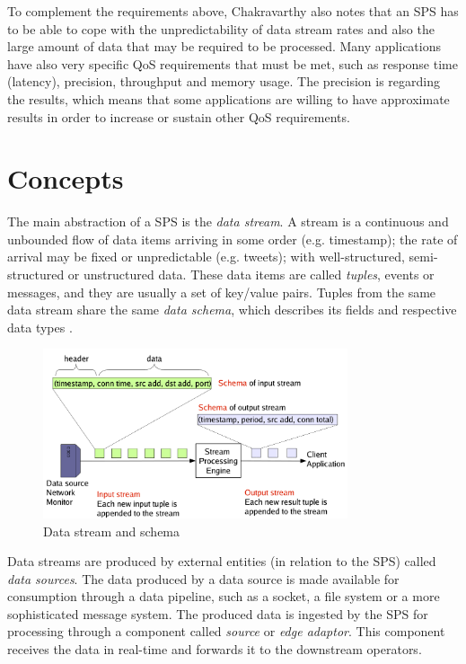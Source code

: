 \documentclass[ppgc,diss,english]{iiufrgs}
\begin{document}
To complement the requirements above, Chakravarthy \cite{chakravarthy2009stream} also notes that an SPS has to be able to cope with the unpredictability of data stream rates and also the large amount of data that may be required to be processed. Many applications have also very specific QoS requirements that must be met, such as response time (latency), precision, throughput and memory usage. The precision is regarding the results, which means that some applications are willing to have approximate results in order to increase or sustain other QoS requirements.


\section{Concepts}
\label{sec:esp:concepts}

The main abstraction of a SPS is the \emph{data stream}. A stream is a continuous and unbounded flow of data items arriving in some order (e.g. timestamp); the rate of arrival may be fixed or unpredictable (e.g. tweets); with well-structured, semi-structured or unstructured data. These data items are called \emph{tuples}, events or messages, and they are usually a set of key/value pairs. Tuples from the same data stream share the same \emph{data schema}, which describes its fields and respective data types \cite{chakravarthy2009stream}.

\begin{figure}[!ht]
	\centering
	\includegraphics[width=0.8\textwidth]{images/streams_schemas.png}
	\caption[Data stream and schema]{Data stream and schema \cite{balazinska2005fault}}
	\label{fig:sps_data_stream}
\end{figure}

Data streams are produced by external entities (in relation to the SPS) called \emph{data sources}. The data produced by a data source is made available for consumption through a data pipeline, such as a socket, a file system or a more sophisticated message system. The produced data is ingested by the SPS for processing through a component called \emph{source} or \emph{edge adaptor}. This component receives the data in real-time and forwards it to the downstream operators.
\end{document}
